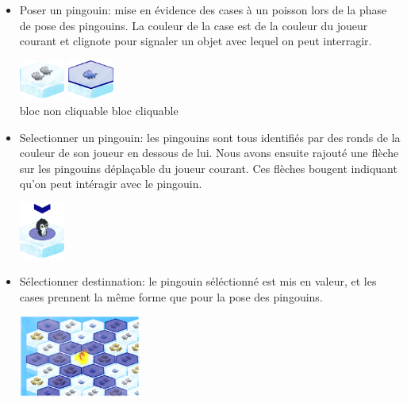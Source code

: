 \documentclass{report}
\begin{document}
\begin{itemize}
\item Poser un pingouin: mise en évidence des cases à un poisson lors de la phase de pose des pingouins. La couleur de la case est de la couleur du joueur courant et clignote pour signaler un objet avec lequel on peut interragir.

  \begin{center}
    \includegraphics[width=1.5cm]{image/bloc_simple.png}    
    \hspace{1cm}
    \includegraphics[width=1.5cm]{image/bloc_mev.png}
    \\
    bloc non cliquable \hspace{0.5cm} bloc cliquable
  \end{center}

\item Selectionner un pingouin: les pingouins sont tous identifiés par des ronds de la couleur de son joueur en dessous de lui. Nous avons ensuite rajouté une flèche sur les pingouins déplaçable du joueur courant. Ces flèches bougent indiquant qu'on peut intéragir avec le pingouin.
  \begin{center}
    \includegraphics[width=1.5cm]{image/bloc_pingouin.png}    
  \end{center}

\item Sélectionner destinnation: le pingouin séléctionné est mis en valeur, et les cases prennent la même forme que pour la pose des pingouins.
  \begin{center}
    \includegraphics[width=4cm]{image/case_select_dest.png}    
  \end{center}


\end{itemize}
\end{document}
